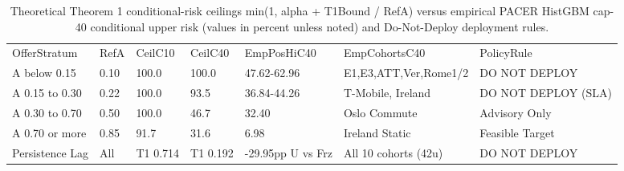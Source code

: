 \begin{table}[!ht]
\centering\footnotesize\setlength{\tabcolsep}{4pt}
\caption{Theoretical Theorem 1 conditional-risk ceilings min(1, alpha + T1Bound / RefA) versus empirical PACER HistGBM cap-40 conditional upper risk (values in percent unless noted) and Do-Not-Deploy deployment rules.}
\begin{tabular}{lllllll}
\hline
OfferStratum & RefA & CeilC10 & CeilC40 & EmpPosHiC40 & EmpCohortsC40 & PolicyRule \\
A below 0.15 & 0.10 & 100.0 & 100.0 & 47.62-62.96 & E1,E3,ATT,Ver,Rome1/2 & DO NOT DEPLOY \\
A 0.15 to 0.30 & 0.22 & 100.0 & 93.5 & 36.84-44.26 & T-Mobile, Ireland & DO NOT DEPLOY (SLA) \\
A 0.30 to 0.70 & 0.50 & 100.0 & 46.7 & 32.40 & Oslo Commute & Advisory Only \\
A 0.70 or more & 0.85 & 91.7 & 31.6 & 6.98 & Ireland Static & Feasible Target \\
Persistence Lag & All & T1 0.714 & T1 0.192 & -29.95pp U vs Frz & All 10 cohorts (42u) & DO NOT DEPLOY \\
\hline
\end{tabular}
\end{table}
